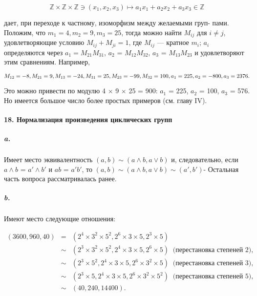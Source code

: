 {\begin{equation*}
\mathbb{Z} \times \mathbb{Z} \times \mathbb{Z} \ni (x_{1},x_{2},x_{3}) \mapsto a_{1}x_{1} + a_{2}x_{2} + a_{3}x_{3} \in \mathbb {Z}
\end{equation*}




\noindent дает, при переходе к частному, изоморфизм между желаемыми груп-
пами. Положим, что $m_1 = 4, m_2 = 9, m_3 = 25$, тогда можно найти $M_{ij}$
для $i \neq j$, удовлетворяющие условию $M_{ij} + M_{ji} = 1$, где $M_{ij}$ — кратное
$m_{i}$; $a_i$ определяются через $a_1 = M_{21}M_{31}$, $a_2$ = $M_{12}M_{32}$, $a_3$ = $M_{13}M_{23}$ и
удовлетворяют этим сравнениям. Например,

\begin{equation*}
M_{12} = -8, M_{21} = 9, M_{13} = -24, M_{31} = 25, M_{23} = -99, M_{32} = 100, \\
a_1 = 225, a_2 = -800, a_3 = 2376.
\end{equation*}

\noindent Это можно привести по модулю 4 $\times$ 9 $\times$ 25 = 900: $a_1$ = 225, $a_2$ = 100,
$a_3$ = 576. Но имеется большое число более простых примеров (см. главу IV).

\paragraph{18. Нормализация произведения циклических групп}

\subparagraph{a.} Имеет место эквивалентность $(a,b) \sim (a \wedge b, a \vee b)$ и, следовательно,
если $a \wedge b$ = $a' \wedge b'$ и $ab$ = $a'b'$, то $(a,b) \sim (a \wedge b, a \vee b) \sim (a',b')$- Остальная
часть вопроса рассматривалась ранее.

\subparagraph{b.} Имеют место следующие отношения:

\begin{eqnarray*}
(3600,960,40) &=&(2^4 \times 3^2 \times 5^2, 2^6 \times 3 \times 5, 2^3 \times 5)\\
              &\sim&(2^3 \times 3^2 \times 5^2, 2^4 \times 3 \times 5, 2^6 \times 5)\;\;\text{(перестановка степеней 2),}\\
              &\sim&(2^3 \times 5^2, 2^4 \times 3 \times 5, 2^6 \times 3^2 \times 5)\;\;\text{(перестановка степеней 3),}\\
              &\sim&(2^3 \times 5, 2^4 \times 3 \times 5, 2^6 \times 3^2 \times 5^2)\;\;\text{(перестановка степеней 5),}\\
              &\sim&(40,240,14400).
\end{eqnarray*}

}
